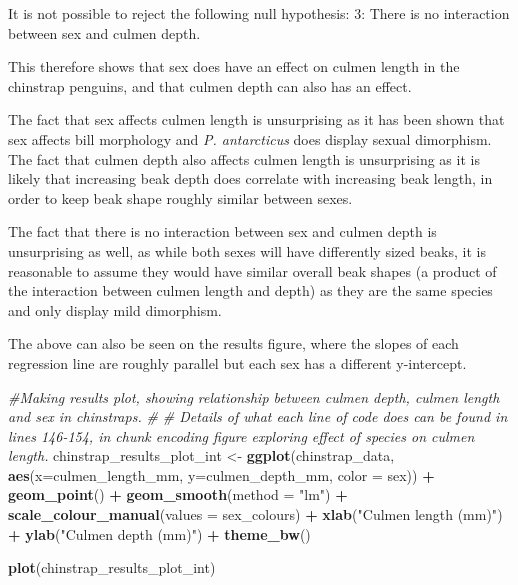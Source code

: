 \documentclass[
]{article}
\newenvironment{Shaded}{\begin{snugshade}}{\end{snugshade}}
\newcommand{\AttributeTok}[1]{\textcolor[rgb]{0.13,0.29,0.53}{#1}}
\newcommand{\CommentTok}[1]{\textcolor[rgb]{0.56,0.35,0.01}{\textit{#1}}}
\newcommand{\FunctionTok}[1]{\textcolor[rgb]{0.13,0.29,0.53}{\textbf{#1}}}
\newcommand{\NormalTok}[1]{#1}
\newcommand{\OtherTok}[1]{\textcolor[rgb]{0.56,0.35,0.01}{#1}}
\newcommand{\SpecialCharTok}[1]{\textcolor[rgb]{0.81,0.36,0.00}{\textbf{#1}}}
\newcommand{\StringTok}[1]{\textcolor[rgb]{0.31,0.60,0.02}{#1}}
\begin{document}
It is not possible to reject the following null hypothesis: 3: There is
no interaction between sex and culmen depth.

This therefore shows that sex does have an effect on culmen length in
the chinstrap penguins, and that culmen depth can also has an effect.

The fact that sex affects culmen length is unsurprising as it has been
shown that sex affects bill morphology and \emph{P. antarcticus} does
display sexual dimorphism. The fact that culmen depth also affects
culmen length is unsurprising as it is likely that increasing beak depth
does correlate with increasing beak length, in order to keep beak shape
roughly similar between sexes.

The fact that there is no interaction between sex and culmen depth is
unsurprising as well, as while both sexes will have differently sized
beaks, it is reasonable to assume they would have similar overall beak
shapes (a product of the interaction between culmen length and depth) as
they are the same species and only display mild dimorphism.

The above can also be seen on the results figure, where the slopes of
each regression line are roughly parallel but each sex has a different
y-intercept.

\begin{Shaded}
\begin{Highlighting}[]
\CommentTok{\#Making results plot, showing relationship between culmen depth, culmen length and sex in chinstraps.}
\CommentTok{\# \# Details of what each line of code does can be found in lines 146{-}154, in chunk encoding figure exploring effect of species on culmen length. }
\NormalTok{chinstrap\_results\_plot\_int }\OtherTok{\textless{}{-}} 
\FunctionTok{ggplot}\NormalTok{(chinstrap\_data, }
       \FunctionTok{aes}\NormalTok{(}\AttributeTok{x=}\NormalTok{culmen\_length\_mm, }\AttributeTok{y=}\NormalTok{culmen\_depth\_mm, }\AttributeTok{color =}\NormalTok{ sex)) }\SpecialCharTok{+} 
  \FunctionTok{geom\_point}\NormalTok{() }\SpecialCharTok{+} 
  \FunctionTok{geom\_smooth}\NormalTok{(}\AttributeTok{method =} \StringTok{"lm"}\NormalTok{) }\SpecialCharTok{+} 
  \FunctionTok{scale\_colour\_manual}\NormalTok{(}\AttributeTok{values =}\NormalTok{ sex\_colours) }\SpecialCharTok{+} 
  \FunctionTok{xlab}\NormalTok{(}\StringTok{"Culmen length (mm)"}\NormalTok{) }\SpecialCharTok{+} 
  \FunctionTok{ylab}\NormalTok{(}\StringTok{"Culmen depth (mm)"}\NormalTok{) }\SpecialCharTok{+} 
  \FunctionTok{theme\_bw}\NormalTok{()}

\FunctionTok{plot}\NormalTok{(chinstrap\_results\_plot\_int)}
\end{Highlighting}
\end{Shaded}
\end{document}
